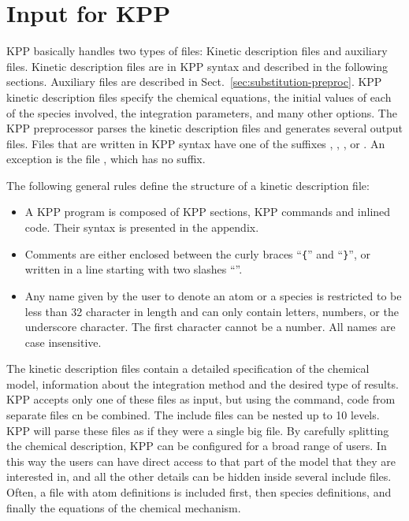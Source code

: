 \documentclass[twoside]{article}
\begin{document}
\section{Input for KPP}
\label{sec:input}

KPP basically handles two types of files: Kinetic description files and
auxiliary files. Kinetic description files are in KPP syntax and
described in the following sections. Auxiliary files are described in
Sect.~\ref{sec:substitution-preproc}. KPP kinetic description files
specify the chemical equations, the initial values of each of the
species involved, the integration parameters, and many other options.
The KPP preprocessor parses the kinetic description files and generates
several output files. Files that are written in KPP syntax have one of
the suffixes , , , or . An
exception is the file , which has no suffix.

The following general rules define the structure of a kinetic
description file:
%
\begin{itemize}
\item A KPP program is composed of KPP sections, KPP commands and
  inlined code. Their syntax is presented in the appendix.
\item Comments are either enclosed between the curly braces ``\verb|{|''
    and ``\verb|}|'', or written in a line starting with two slashes
  ``\code{//}''.
\item Any name given by the user to denote an atom or a species is
  restricted to be less than 32 character in length and can only contain
  letters, numbers, or the underscore character. The first character
  cannot be a number. All names are case insensitive.
\end{itemize}
%
The kinetic description files contain a detailed specification of the
chemical model, information about the integration method and the desired
type of results. KPP accepts only one of these files as input, but using
the  command, code from separate files cn be combined.
The include files can be nested up to 10 levels. KPP will parse these
files as if they were a single big file. By carefully splitting the
chemical description, KPP can be configured for a broad range of users.
In this way the users can have direct access to that part of the model
that they are interested in, and all the other details can be hidden
inside several include files. Often, a file with atom definitions is
included first, then species definitions, and finally the equations of
the chemical mechanism.
\end{document}
